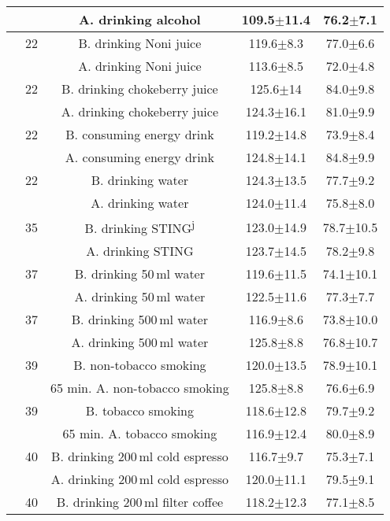 \documentclass[journal,article,moreauthors]{Definitions/mdpi}
\begin{document}
\begin{table}[tb]
\begin{center}
{\begin{tabularx}{\textwidth}{rcccc}
& & A. drinking alcohol & 109.5$\pm$11.4 & 76.2$\pm$7.1 
\\\hline
\citep{Nowak2019-si} & 22 & B. drinking Noni juice & 119.6$\pm$8.3 &  77.0$\pm$6.6 \\ 
& & A. drinking Noni juice & 113.6$\pm$8.5 & 72.0$\pm$4.8
\\\hline
\citep{Nowak2019-si} & 22 & B. drinking chokeberry juice & 125.6$\pm$14 & 84.0$\pm$9.8 \\ 
& & A. drinking chokeberry juice & 124.3$\pm$16.1 &81.0$\pm$9.9
\\\hline
\citep{Nowak2019-si} & 22 & B. consuming energy drink & 119.2$\pm$14.8 & 73.9$\pm$8.4 \\ 
& & A. consuming energy drink & 124.8$\pm$14.1 & 84.8$\pm$9.9
\\\hline
\citep{Nowak2019-si} & 22 & B. drinking water & 124.3$\pm$13.5 & 77.7$\pm$9.2 \\ 
& & A. drinking water & 124.0$\pm$11.4 & 75.8$\pm$8.0
\\\hline
\citep{luqmanexperimental} & 35 & B. drinking STING\textsuperscript{j} & 123.0$\pm$14.9 & 78.7$\pm$10.5 \\ 
& & A. drinking STING & 123.7$\pm$14.5 & 78.2$\pm$9.8
\\\hline
\citep{olatunji2011water} & 37 & B. drinking 50\,ml water & 119.6$\pm$11.5 & 74.1$\pm$10.1 \\ 
& & A. drinking 50\,ml water & 122.5$\pm$11.6 & 77.3$\pm$7.7 
\\\hline
\citep{olatunji2011water} & 37 & B. drinking 500\,ml water & 116.9$\pm$8.6 & 73.8$\pm$10.0 \\ 
& & A. drinking 500\,ml water & 125.8$\pm$8.8 & 76.8$\pm$10.7
\\\hline
\citep{kho2006acute} & 39 & B. non-tobacco smoking & 120.0$\pm$13.5 & 78.9$\pm$10.1 \\ 
& & 65 min. A. non-tobacco smoking & 125.8$\pm$8.8 & 76.6$\pm$6.9
\\\hline
\citep{kho2006acute} & 39 & B. tobacco smoking & 118.6$\pm$12.8 & 79.7$\pm$9.2 \\ 
& & 65 min. A. tobacco smoking & 116.9$\pm$12.4 & 80.0$\pm$8.9
\\\hline
\citep{Papakonstantinou2016-mj} & 40 & B. drinking 200\,ml cold espresso & 116.7$\pm$9.7 & 75.3$\pm$7.1 \\ 
& & A. drinking 200\,ml cold espresso & 120.0$\pm$11.1 & 79.5$\pm$9.1
\\\hline
\citep{Papakonstantinou2016-mj} & 40 & B. drinking 200\,ml filter coffee & 118.2$\pm$12.3 & 77.1$\pm$8.5 \\ 

\end{tabularx}}
\end{center}
\end{table}
\end{document}
